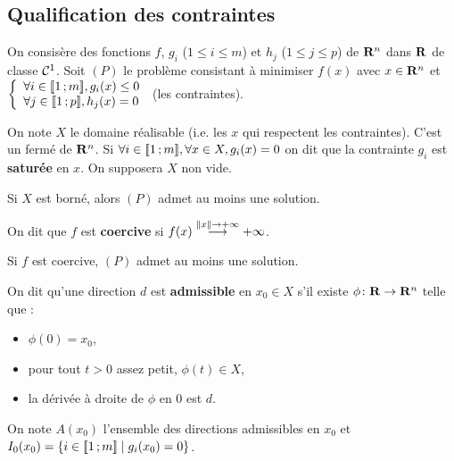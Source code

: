  \subsection{Qualification des contraintes}

	On consisère des fonctions $f$, $g_i$ ($1 \leq i \leq m$) et $h_j$ ($1 \leq j \leq p$) de $\mathbf{R}^n$ dans $\mathbf{R}$ de classe $\mathcal{C}^1$.
	Soit $(P)$ le problème consistant à minimiser $f(x)$ avec $x \in \mathbf{R}^n$ et
	$\left\{ \begin{array}{l}
		\forall i \in \mathopen{[\![}1\mathclose{}\mathpunct{};m\mathclose{]\!]}, g_i(x) \leq 0 \\
		\forall j \in \mathopen{[\![}1\mathclose{}\mathpunct{};p\mathclose{]\!]}, h_j(x) = 0
	\end{array} \right.$ (les contraintes).

	On note $X$ le domaine réalisable (i.e. les $x$ qui respectent les contraintes). C'est un fermé de $\mathbf{R}^n$.
	Si $\forall i \in \mathopen{[\![}1\mathclose{}\mathpunct{};m\mathclose{]\!]}, \forall x \in X, g_i(x) = 0$ on dit que la contrainte $g_i$ est \textbf{saturée} en $x$.
	On supposera $X$ non vide.

	\begin{thm}
		Si $X$ est borné, alors $(P)$ admet au moins une solution.
	\end{thm}

	\begin{defn}
		On dit que $f$ est \textbf{coercive} si $f(x) \overset{\left\lVert x\right\rVert \to +\infty}{\longrightarrow} + \infty$.
	\end{defn}

	\begin{thm}
		Si $f$ est coercive, $(P)$ admet au moins une solution.
	\end{thm}

	\begin{defn}
		On dit qu'une direction $d$ est \textbf{admissible} en $x_0 \in X$ s'il existe $\phi \colon \mathbf{R} \to \mathbf{R}^n$ telle que :
		\begin{itemize}
			\item[\textbullet] $\phi(0) = x_0$,
			\item[\textbullet] pour tout $t > 0$ assez petit, $\phi(t) \in X$,
			\item[\textbullet] la dérivée à droite de $\phi$ en $0$ est $d$.
		\end{itemize}
	\end{defn}

	\begin{note}
		On note $A(x_0)$ l'ensemble des directions admissibles en $x_0$ et $I_0(x_0) = \{ i \in \mathopen{[\![}1\mathclose{}\mathpunct{};m\mathclose{]\!]} \mid g_i(x_0) = 0 \}$.
	\end{note}

